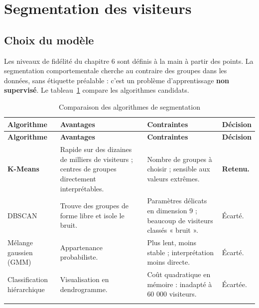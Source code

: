 \section{Segmentation des visiteurs}
\subsection{Choix du modèle}
Les niveaux de fidélité du chapitre 6 sont définis à la main à partir des points. La segmentation comportementale cherche au contraire des groupes dans les données, sans étiquette préalable : c'est un problème d'apprentissage \textbf{non supervisé}. Le tableau~\ref{tab:comparaison-seg} compare les algorithmes candidats.
\renewcommand{\arraystretch}{1.4}
\begin{longtable}{|p{3.1cm}|p{4.3cm}|p{4.3cm}|p{2.5cm}|}
\hline
\textbf{Algorithme} & \textbf{Avantages} & \textbf{Contraintes} & \textbf{Décision} \\
\hline
\endfirsthead
\hline
\textbf{Algorithme} & \textbf{Avantages} & \textbf{Contraintes} & \textbf{Décision} \\
\hline
\endhead
\textbf{K-Means} & Rapide sur des dizaines de milliers de visiteurs ; centres de groupes directement interprétables. & Nombre de groupes à choisir ; sensible aux valeurs extrêmes. & \textbf{Retenu.} \\
\hline
DBSCAN & Trouve des groupes de forme libre et isole le bruit. & Paramètres délicats en dimension 9 ; beaucoup de visiteurs classés « bruit ». & Écarté. \\
\hline
Mélange gaussien (GMM) & Appartenance probabiliste. & Plus lent, moins stable ; interprétation moins directe. & Écarté. \\
\hline
Classification hiérarchique & Visualisation en dendrogramme. & Coût quadratique en mémoire : inadapté à 60 000 visiteurs. & Écartée. \\
\hline
\caption{Comparaison des algorithmes de segmentation}
\label{tab:comparaison-seg}
\end{longtable}


